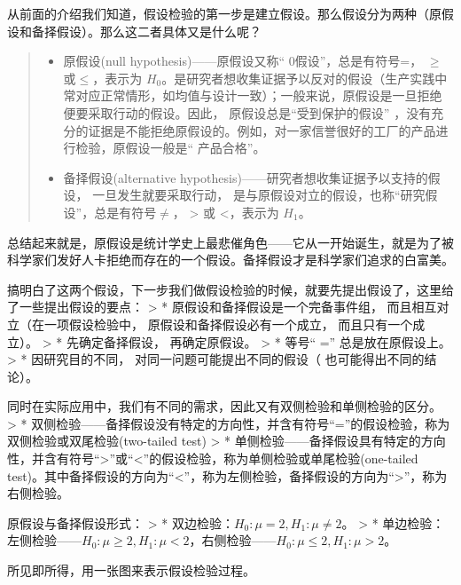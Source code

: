 \documentclass[]{ctexbook}
\providecommand{\tightlist}{%
  \setlength{\itemsep}{0pt}\setlength{\parskip}{0pt}}
\begin{document}
从前面的介绍我们知道，假设检验的第一步是建立假设。那么假设分为两种（原假设和备择假设）。那么这二者具体又是什么呢？

\begin{quote}
\begin{itemize}
\tightlist
\item
  原假设(null hypothesis)------原假设又称`` 0假设''，总是有符号=， \(\geq\)或\(\leq\)，表示为 \(H_0\)。是研究者想收集证据予以反对的假设（生产实践中常对应正常情形，如均值与设计一致）；一般来说，原假设是一旦拒绝便要采取行动的假设。因此， 原假设总是``受到保护的假设'' ，没有充分的证据是不能拒绝原假设的。例如，对一家信誉很好的工厂的产品进行检验，原假设一般是`` 产品合格''。
\item
  备择假设(alternative hypothesis)------研究者想收集证据予以支持的假设， 一旦发生就要采取行动， 是与原假设对立的假设，也称``研究假设''，总是有符号\(\neq\)， \textgreater{} 或 \textless，表示为 \(H_1\)。
\end{itemize}
\end{quote}

总结起来就是，原假设是统计学史上最悲催角色------它从一开始诞生，就是为了被科学家们发好人卡拒绝而存在的一个假设。备择假设才是科学家们追求的白富美。

搞明白了这两个假设，下一步我们做假设检验的时候，就要先提出假设了，这里给了一些提出假设的要点：
\textgreater{} * 原假设和备择假设是一个完备事件组， 而且相互对立（在一项假设检验中， 原假设和备择假设必有一个成立， 而且只有一个成立）。
\textgreater{} * 先确定备择假设， 再确定原假设。
\textgreater{} * 等号`` ='' 总是放在原假设上。
\textgreater{} * 因研究目的不同， 对同一问题可能提出不同的假设（ 也可能得出不同的结论）。

同时在实际应用中，我们有不同的需求，因此又有双侧检验和单侧检验的区分。
\textgreater{} * 双侧检验------备择假设没有特定的方向性，并含有符号``=''的假设检验，称为双侧检验或双尾检验(two-tailed test)
\textgreater{} * 单侧检验------备择假设具有特定的方向性，并含有符号``\textgreater{}''或``\textless{}''的假设检验，称为单侧检验或单尾检验(one-tailed test)。其中备择假设的方向为``\textless{}''，称为左侧检验，备择假设的方向为``\textgreater{}''，称为右侧检验。

原假设与备择假设形式：
\textgreater{} * 双边检验：\(H_0: \mu=2,H_1: \mu\neq2\)。
\textgreater{} * 单边检验：左侧检验------\(H_0: \mu\ge2,H_1: \mu<2\)，右侧检验------\(H_0: \mu\le2,H_1: \mu>2\)。

所见即所得，用一张图来表示假设检验过程。
\end{document}

